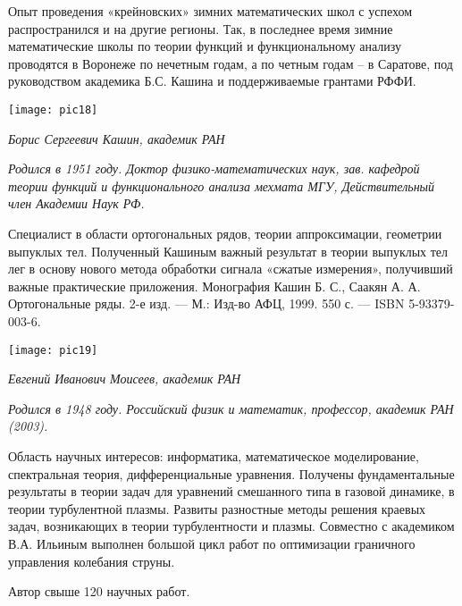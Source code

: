 Опыт проведения «крейновских» зимних математических школ с успехом распространился и на другие регионы. Так, в последнее время зимние математические школы по теории функций и функциональному анализу проводятся в Воронеже по нечетным годам, а по четным годам – в Саратове, под руководством академика Б.С. Кашина и поддерживаемые грантами РФФИ.

\begin{center}

\texttt{[image: pic18]}


{\it Борис Сергеевич Кашин, академик РАН
}
\end{center}


{\it Родился в 1951 году. Доктор физико-математических наук, зав. кафедрой теории функций и функционального анализа мехмата МГУ, Действительный член Академии Наук РФ.

 Специалист в области ортогональных рядов, теории аппроксимации, геометрии выпуклых тел. Полученный Кашиным важный результат в теории выпуклых тел лег в основу нового метода обработки сигнала «сжатые измерения», получивший важные практические приложения. Монография Кашин Б. С., Саакян А. А.  Ортогональные ряды. 2-е изд. — М.: Изд-во АФЦ, 1999. 550 с. — ISBN 5-93379-003-6.}


\begin{center}

\texttt{[image: pic19]}


{\it Евгений Иванович Моисеев, академик РАН
}
\end{center}

{\it
Родился в 1948 году. Российский физик и математик, профессор, академик РАН (2003).

Область научных интересов: информатика, математическое моделирование, спектральная теория, дифференциальные уравнения. Получены фундаментальные результаты в теории задач для уравнений смешанного типа в газовой динамике, в теории турбулентной плазмы. Развиты разностные методы решения краевых задач, возникающих в теории турбулентности и плазмы. Совместно с академиком В.А. Ильиным выполнен большой цикл работ по оптимизации граничного управления колебания струны.

Автор свыше 120 научных работ.
}

